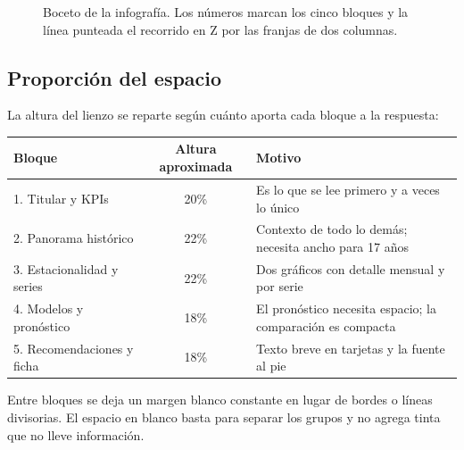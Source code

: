 \begin{figure}[ht]
\caption{Boceto de la infografía. Los números marcan los cinco bloques y la
línea punteada el recorrido en Z por las franjas de dos columnas.}
\label{fig:boceto}
\end{figure}

\subsection{Proporción del espacio}

La altura del lienzo se reparte según cuánto aporta cada bloque a la respuesta:

\begin{center}
\begin{tabular}{@{}lcl@{}}
\toprule
Bloque & Altura aproximada & Motivo \\
\midrule
1. Titular y KPIs          & 20\% & Es lo que se lee primero y a veces lo único \\
2. Panorama histórico      & 22\% & Contexto de todo lo demás; necesita ancho para 17 años \\
3. Estacionalidad y series & 22\% & Dos gráficos con detalle mensual y por serie \\
4. Modelos y pronóstico    & 18\% & El pronóstico necesita espacio; la comparación es compacta \\
5. Recomendaciones y ficha & 18\% & Texto breve en tarjetas y la fuente al pie \\
\bottomrule
\end{tabular}
\end{center}

Entre bloques se deja un margen blanco constante en lugar de bordes o líneas
divisorias. El espacio en blanco basta para separar los grupos y no agrega tinta
que no lleve información.
